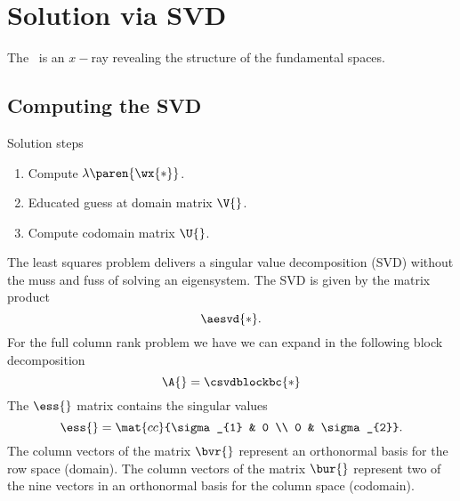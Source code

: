 \chapter{Solution via SVD}

The \asvd \ is an $x-$ray revealing the structure of the fundamental spaces.

\section{Computing the SVD}  %
Solution steps
\begin{enumerate}
  \item Compute $\lambda\paren{\wx{*}}$.
  \item Educated guess at domain matrix $\V{}$.
  \item Compute codomain matrix $\U{}$.
\end{enumerate}
The least squares problem delivers a singular value decomposition (SVD) without the muss and fuss of solving an eigensystem. The SVD is given by the matrix product
  \begin{equation*}
    \aesvd{*}.
  \end{equation*}
For the full column rank problem we have we can expand in the following block decomposition
  \begin{equation*}
    \A{} = \csvdblockbc{*}
  \end{equation*}
The $\ess{}$ matrix contains the singular values
  \begin{equation*}
    \ess{} = \mat{cc}{\sigma_{1} & 0 \\ 0 & \sigma_{2}}.
  \end{equation*}
The column vectors of the matrix $\bvr{}$ represent an orthonormal basis for the row space (domain). The column vectors of the matrix $\bur{}$ represent two of the nine vectors in an orthonormal basis for the column space (codomain).

